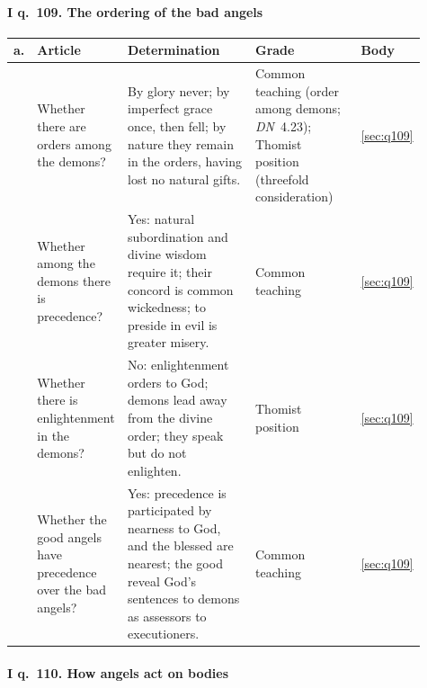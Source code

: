 \endgroup

\paragraph{I q.~109. The ordering of the bad angels}

\begingroup\footnotesize
\begin{longtable}{>{\raggedright\arraybackslash}p{0.03\linewidth}>{\raggedright\arraybackslash}p{0.22\linewidth}>{\raggedright\arraybackslash}p{0.33\linewidth}>{\raggedright\arraybackslash}p{0.27\linewidth}>{\raggedright\arraybackslash}p{0.06\linewidth}}
\toprule
\textbf{a.} & \textbf{Article} & \textbf{Determination} & \textbf{Grade} & \textbf{Body}\\
\midrule
\endhead
1 & Whether there are orders among the demons? & By glory never; by imperfect grace once, then fell; by nature they remain in the orders, having lost no natural gifts. & Common teaching (order among demons; \emph{DN}~4.23); Thomist position (threefold consideration) & \ref{sec:q109}\\
2 & Whether among the demons there is precedence? & Yes: natural subordination and divine wisdom require it; their concord is common wickedness; to preside in evil is greater misery. & Common teaching & \ref{sec:q109}\\
3 & Whether there is enlightenment in the demons? & No: enlightenment orders to God; demons lead away from the divine order; they speak but do not enlighten. & Thomist position & \ref{sec:q109}\\
4 & Whether the good angels have precedence over the bad angels? & Yes: precedence is participated by nearness to God, and the blessed are nearest; the good reveal God's sentences to demons as assessors to executioners. & Common teaching & \ref{sec:q109}\\
\bottomrule
\end{longtable}
\endgroup

\paragraph{I q.~110. How angels act on bodies}

